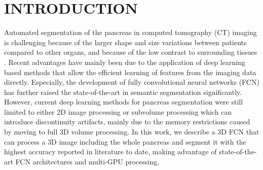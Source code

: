 \documentclass[a4paper]{spie}  %
\begin{document}
\section{INTRODUCTION}
Automated segmentation of the pancreas in computed tomography (CT) imaging is challenging because of the larger shape and size variations between patients compared to other organs, and because of the low contrast to surrounding tissues \cite{roth2017spatial}. Recent advantages have mainly been due to the application of deep learning based methods that allow the efficient learning of features from the imaging data directly. Especially, the development of fully convolutional neural networks (FCN) \cite{long2015fully} has further raised the state-of-the-art in semantic segmentation significantly. However, current deep learning methods for pancreas segmentation were still limited to either 2D image processing \cite{roth2017spatial,zhou2016pancreas} or subvolume processing \cite{roth2017hierarchical} which can introduce discontinuity artifacts, mainly due to the memory restrictions caused by moving to full 3D volume processing. In this work, we describe a 3D FCN that can process a 3D image including the whole pancreas and segment it with the highest accuracy reported in literature to date, making advantage of state-of-the-art FCN architectures and multi-GPU processing.
	
\end{document}
